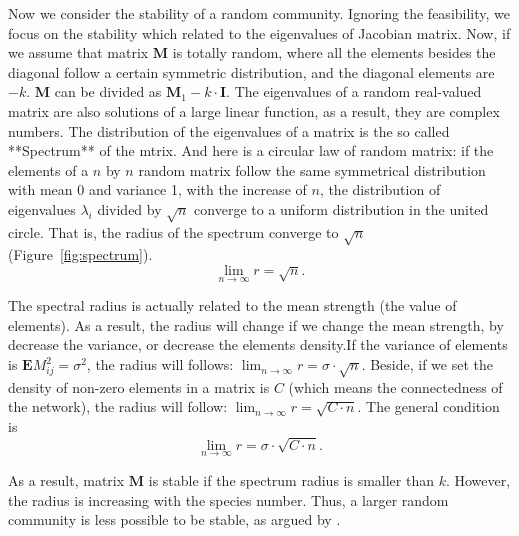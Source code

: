     Now we consider the stability of a random community. Ignoring the feasibility, we focus on the stability which related to the eigenvalues of Jacobian matrix. Now, if we assume that matrix $\mathbf{M}$ is totally random, where all the elements besides the diagonal follow a certain symmetric distribution, and the diagonal elements are $-k$. $\mathbf{M}$ can be divided as $\mathbf{M}_1 - k \cdot \mathbf{I}$. The eigenvalues of a random real-valued matrix are also solutions of a large linear function, as a result, they are complex numbers. The distribution of the eigenvalues of a matrix is the so called **Spectrum** of the mtrix. And here is a circular law of random matrix: if the elements of a $n$ by $n$ random matrix follow the same symmetrical distribution with mean 0 and variance 1, with the increase of $n$, the distribution of eigenvalues $\lambda_i$ divided by $\sqrt{n}$ converge to a uniform distribution in the united circle. That is, the radius of the spectrum converge to $\sqrt{n}$ (Figure~\ref{fig:spectrum}).
    \begin{equation}
        \lim_{n \rightarrow \infty} r = \sqrt{n}.
    \end{equation}

    The spectral radius is actually related to the mean strength (the value of elements). As a result, the radius will change if we change the mean strength, by decrease the variance, or decrease the elements density.If the variance of elements is $\mathbf{E} M^2_{ij} = \sigma^2$, the radius will follows: $\lim_{n \rightarrow \infty} r = \sigma \cdot \sqrt{n}$. Beside, if we set the density of non-zero elements in a matrix is $C$ (which means the connectedness of the network), the radius will follow: $\lim_{n \rightarrow \infty} r = \sqrt{C \cdot n}$. The general condition is
    \begin{equation}
        \lim_{n \rightarrow \infty} r = \sigma \cdot \sqrt{C \cdot n}.
    \end{equation}

    As a result, matrix $\mathbf{M}$ is stable if the spectrum radius is smaller than $k$. However, the radius is increasing with the species number. Thus, a larger random community is less possible to be stable, as argued by \citet{may_will_1972}.